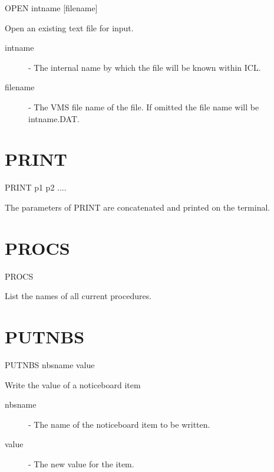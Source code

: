 \documentclass[twoside,11pt,nolof,chapters]{starlink}
\begin{document}
   OPEN \hspace{.5cm} intname \hspace{.5cm} [filename]

 Open an existing text file for input.

\begin{description}

\item[intname]  -  The internal name by which the file will be known
                  within ICL.

\item[filename]  -  The VMS file name of the file. If omitted the
                  file name will be intname.DAT.

\end{description}

\section{PRINT\label{PRINT}}

    PRINT  \hspace{.5cm}  p1 \hspace{.5cm} p2  ....

 The parameters of PRINT are concatenated and printed on the terminal.

\section{PROCS\label{PROCS}}

    PROCS

 List the names of all current procedures.

\section{PUTNBS\label{PUTNBS}}

   PUTNBS \hspace{.5cm}  nbsname \hspace{.5cm} value

Write the value of a noticeboard item

\begin{description}

\item[nbsname] - The name of the noticeboard item to be written.

\item[value] - The new value for the item.

\end{description}
\end{document}
